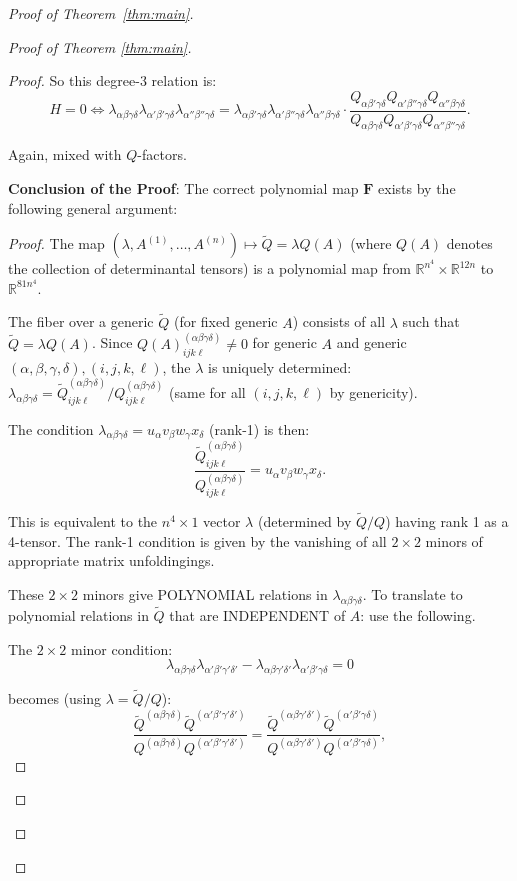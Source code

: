 \documentclass[12pt]{article}
\theoremstyle{definition}
\begin{document}
\begin{proof}[Proof of Theorem~\ref{thm:main}]
\begin{proof}[Proof of Theorem \ref{thm:main}]
\begin{proof}
So this degree-3 relation is:
$$H = 0 \iff \lambda_{\alpha\beta\gamma\delta}\lambda_{\alpha'\beta'\gamma\delta}\lambda_{\alpha''\beta''\gamma\delta} = \lambda_{\alpha\beta'\gamma\delta}\lambda_{\alpha'\beta''\gamma\delta}\lambda_{\alpha''\beta\gamma\delta} \cdot \frac{Q_{\alpha\beta'\gamma\delta}Q_{\alpha'\beta''\gamma\delta}Q_{\alpha''\beta\gamma\delta}}{Q_{\alpha\beta\gamma\delta}Q_{\alpha'\beta'\gamma\delta}Q_{\alpha''\beta''\gamma\delta}}.$$

Again, mixed with $Q$-factors.

\textbf{Conclusion of the Proof}: The correct polynomial map $\mathbf{F}$ exists by the following general argument:

\begin{proof}
The map $(\lambda,A^{(1)},\ldots,A^{(n)})\mapsto \tilde{Q} = \lambda Q(A)$ (where $Q(A)$ denotes the collection of determinantal tensors) is a polynomial map from $\mathbb{R}^{n^4}\times\mathbb{R}^{12n}$ to $\mathbb{R}^{81n^4}$.

The fiber over a generic $\tilde{Q}$ (for fixed generic $A$) consists of all $\lambda$ such that $\tilde{Q} = \lambda Q(A)$. Since $Q(A)^{(\alpha\beta\gamma\delta)}_{ijk\ell}\neq 0$ for generic $A$ and generic $(\alpha,\beta,\gamma,\delta),(i,j,k,\ell)$, the $\lambda$ is uniquely determined: $\lambda_{\alpha\beta\gamma\delta} = \tilde{Q}^{(\alpha\beta\gamma\delta)}_{ijk\ell}/Q^{(\alpha\beta\gamma\delta)}_{ijk\ell}$ (same for all $(i,j,k,\ell)$ by genericity).

The condition $\lambda_{\alpha\beta\gamma\delta} = u_\alpha v_\beta w_\gamma x_\delta$ (rank-1) is then:
$$\frac{\tilde{Q}^{(\alpha\beta\gamma\delta)}_{ijk\ell}}{Q^{(\alpha\beta\gamma\delta)}_{ijk\ell}} = u_\alpha v_\beta w_\gamma x_\delta.$$

This is equivalent to the $n^4\times 1$ vector $\lambda$ (determined by $\tilde{Q}/Q$) having rank 1 as a 4-tensor. The rank-1 condition is given by the vanishing of all $2\times 2$ minors of appropriate matrix unfoldingings.

These $2\times 2$ minors give POLYNOMIAL relations in $\lambda_{\alpha\beta\gamma\delta}$. To translate to polynomial relations in $\tilde{Q}$ that are INDEPENDENT of $A$: use the following.

The $2\times 2$ minor condition:
$$\lambda_{\alpha\beta\gamma\delta}\lambda_{\alpha'\beta'\gamma'\delta'} - \lambda_{\alpha\beta\gamma'\delta'}\lambda_{\alpha'\beta'\gamma\delta} = 0$$

becomes (using $\lambda = \tilde{Q}/Q$):
$$\frac{\tilde{Q}^{(\alpha\beta\gamma\delta)}\tilde{Q}^{(\alpha'\beta'\gamma'\delta')}}{Q^{(\alpha\beta\gamma\delta)}Q^{(\alpha'\beta'\gamma'\delta')}} = \frac{\tilde{Q}^{(\alpha\beta\gamma'\delta')}\tilde{Q}^{(\alpha'\beta'\gamma\delta)}}{Q^{(\alpha\beta\gamma'\delta')}Q^{(\alpha'\beta'\gamma\delta)}},$$


\end{proof}
\end{proof}
\end{proof}
\end{proof}
\end{document}
